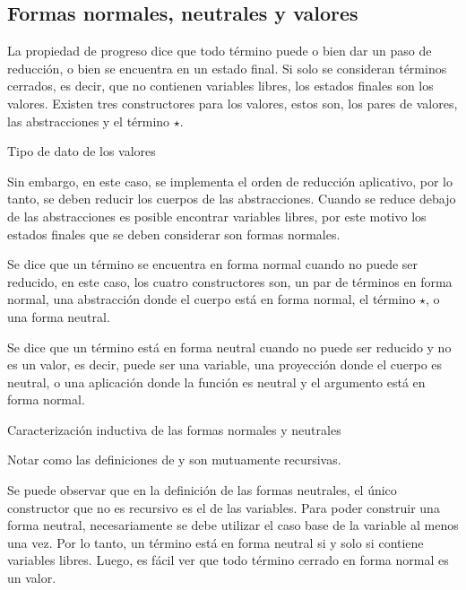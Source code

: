 \subsection{Formas normales, neutrales y valores}

La propiedad de progreso dice que todo término puede o bien dar un paso de reducción, o bien se encuentra en un estado final.
Si solo se consideran términos cerrados, es decir, que no contienen variables libres, los estados finales son los valores.
Existen tres constructores para los valores, estos son, los pares de valores, las abstracciones y el término $\star$.

\begin{codigo}
	Tipo de dato de los valores
\end{codigo}

Sin embargo, en este caso, se implementa el orden de reducción aplicativo, por lo tanto, se deben reducir los cuerpos de las abstracciones.
Cuando se reduce debajo de las abstracciones es posible encontrar variables libres, por este motivo los estados finales que se deben considerar son formas normales.

Se dice que un término se encuentra en forma normal cuando no puede ser reducido, en este caso, los cuatro constructores son, un par de términos en forma normal, una abstracción donde el cuerpo está en forma normal, el término $\star$, o una forma neutral.

Se dice que un término está en forma neutral cuando no puede ser reducido y no es un valor, es decir, puede ser una variable, una proyección donde el cuerpo es neutral, o una aplicación donde la función es neutral y el argumento está en forma normal.

\begin{codigo}
	Caracterización inductiva de las formas normales y neutrales
\end{codigo}

Notar como las definiciones de \const{$\Uparrow$} y \const{$\Downarrow$} son mutuamente recursivas.

Se puede observar que en la definición de las formas neutrales, el único constructor que no es recursivo es el de las variables.
Para poder construir una forma neutral, necesariamente se debe utilizar el caso base de la variable al menos una vez.
Por lo tanto, un término está en forma neutral si y solo si contiene variables libres.
Luego, es fácil ver que todo término cerrado en forma normal es un valor.


